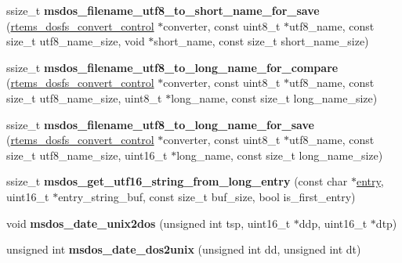 \begin{DoxyCompactItemize}
\mbox{\label{group__libfs__msdos_gabd701d211ae9d10b1beb960014870786}} 
ssize\+\_\+t {\bfseries msdos\+\_\+filename\+\_\+utf8\+\_\+to\+\_\+short\+\_\+name\+\_\+for\+\_\+save} (\mbox{\hyperlink{structrtems__dosfs__convert__control}{rtems\+\_\+dosfs\+\_\+convert\+\_\+control}} $\ast$converter, const uint8\+\_\+t $\ast$utf8\+\_\+name, const size\+\_\+t utf8\+\_\+name\+\_\+size, void $\ast$short\+\_\+name, const size\+\_\+t short\+\_\+name\+\_\+size)
\item 
\mbox{\label{group__libfs__msdos_ga7dc0e6085105ee0308b99cf8f20ad11c}} 
ssize\+\_\+t {\bfseries msdos\+\_\+filename\+\_\+utf8\+\_\+to\+\_\+long\+\_\+name\+\_\+for\+\_\+compare} (\mbox{\hyperlink{structrtems__dosfs__convert__control}{rtems\+\_\+dosfs\+\_\+convert\+\_\+control}} $\ast$converter, const uint8\+\_\+t $\ast$utf8\+\_\+name, const size\+\_\+t utf8\+\_\+name\+\_\+size, uint8\+\_\+t $\ast$long\+\_\+name, const size\+\_\+t long\+\_\+name\+\_\+size)
\item 
\mbox{\label{group__libfs__msdos_gaf04588367d204e045880a569b1433ada}} 
ssize\+\_\+t {\bfseries msdos\+\_\+filename\+\_\+utf8\+\_\+to\+\_\+long\+\_\+name\+\_\+for\+\_\+save} (\mbox{\hyperlink{structrtems__dosfs__convert__control}{rtems\+\_\+dosfs\+\_\+convert\+\_\+control}} $\ast$converter, const uint8\+\_\+t $\ast$utf8\+\_\+name, const size\+\_\+t utf8\+\_\+name\+\_\+size, uint16\+\_\+t $\ast$long\+\_\+name, const size\+\_\+t long\+\_\+name\+\_\+size)
\item 
\mbox{\label{group__libfs__msdos_ga86e51ac587dd834306f28a8f7a6f73b5}} 
ssize\+\_\+t {\bfseries msdos\+\_\+get\+\_\+utf16\+\_\+string\+\_\+from\+\_\+long\+\_\+entry} (const char $\ast$\mbox{\hyperlink{structentry}{entry}}, uint16\+\_\+t $\ast$entry\+\_\+string\+\_\+buf, const size\+\_\+t buf\+\_\+size, bool is\+\_\+first\+\_\+entry)
\item 
\mbox{\label{group__libfs__msdos_gad58f472e49d22af7c146272e92b4b7f3}} 
void {\bfseries msdos\+\_\+date\+\_\+unix2dos} (unsigned int tsp, uint16\+\_\+t $\ast$ddp, uint16\+\_\+t $\ast$dtp)
\item 
\mbox{\label{group__libfs__msdos_gabb497cce021a1aceef72b74e4a3acfda}} 
unsigned int {\bfseries msdos\+\_\+date\+\_\+dos2unix} (unsigned int dd, unsigned int dt)

\end{DoxyCompactItemize}
